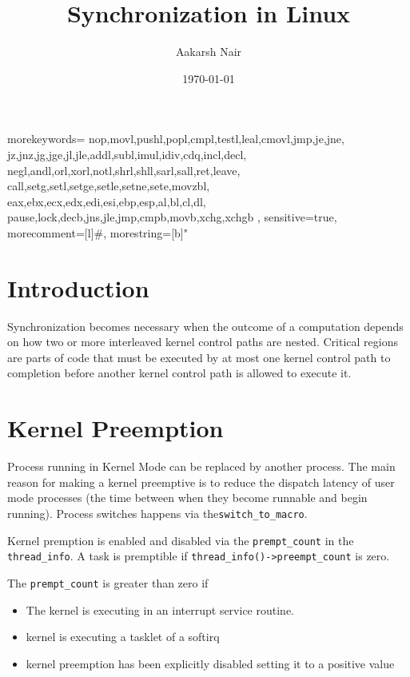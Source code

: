 \documentclass{article}
\title{Synchronization in Linux}
\author{Aakarsh Nair}
\date{\today}
\begin{document}
 {
	morekeywords={
		nop,movl,pushl,popl,cmpl,testl,leal,cmovl,jmp,je,jne,
		jz,jnz,jg,jge,jl,jle,addl,subl,imul,idiv,cdq,incl,decl,
		negl,andl,orl,xorl,notl,shrl,shll,sarl,sall,ret,leave,
		call,setg,setl,setge,setle,setne,sete,movzbl,
		eax,ebx,ecx,edx,edi,esi,ebp,esp,al,bl,cl,dl,
                pause,lock,decb,jns,jle,jmp,cmpb,movb,xchg,xchgb
	},
	sensitive=true,
	morecomment=[l]{\#},
	morestring=[b]"
}

\lstset{language=C}  
\maketitle

\setcounter{tocdepth}{3}
\tableofcontents

\maketitle
\vspace*{1cm}

\section{Introduction}

Synchronization becomes necessary when the outcome of a computation
depends on how two or more interleaved kernel control paths are
nested. Critical regions are parts of code that must be executed by at
most one kernel control path to completion before another kernel
control path is allowed to execute it.


\section{Kernel Preemption}

Process running in Kernel Mode can be replaced by another process.
The main reason for making a kernel preemptive is to reduce the
dispatch latency of user mode processes (the time between when they
become runnable and begin running).  Process switches happens via
the\lstinline{switch_to_macro}.

Kernel premption is enabled and disabled via the
\lstinline{prempt_count} in the \lstinline{thread_info}. A task is
premptible if \lstinline{thread_info()->preempt_count} is zero.

The \lstinline{prempt_count} is greater than zero if 

\begin{itemize}
\item The kernel is executing in an interrupt service routine.
\item kernel is executing a tasklet of a softirq
\item kernel preemption has been explicitly disabled setting it to a
  positive value
\end{itemize}
\end{document}

